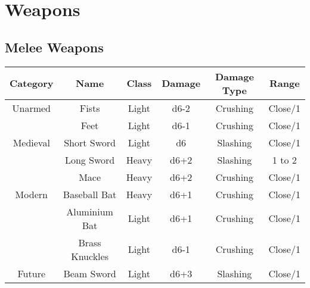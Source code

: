 
\section{Weapons} \label{sec:weapons}
\subsection{Melee Weapons}
\begin{center}
\begin{tabular}{c | c | c | c | c | c}
    \textbf{Category} & \textbf{Name} & \textbf{Class} & \textbf{Damage} & \textbf{Damage Type} & \textbf{Range} \\\hline
    Unarmed  & Fists          & Light & d6-2 & Crushing & Close/1\\
             & Feet           & Light & d6-1 & Crushing & Close/1\\\hline
    Medieval & Short Sword    & Light & d6   & Slashing & Close/1\\
             & Long Sword     & Heavy & d6+2 & Slashing & 1 to 2 \\
             & Mace           & Heavy & d6+2 & Crushing & Close/1\\\hline
    Modern   & Baseball Bat   & Heavy & d6+1 & Crushing & Close/1\\
             & Aluminium Bat  & Light & d6+1 & Crushing & Close/1\\
             & Brass Knuckles & Light & d6-1 & Crushing & Close/1\\\hline
    Future   & Beam Sword     & Light & d6+3 & Slashing & Close/1
\end{tabular}
\end{center}


